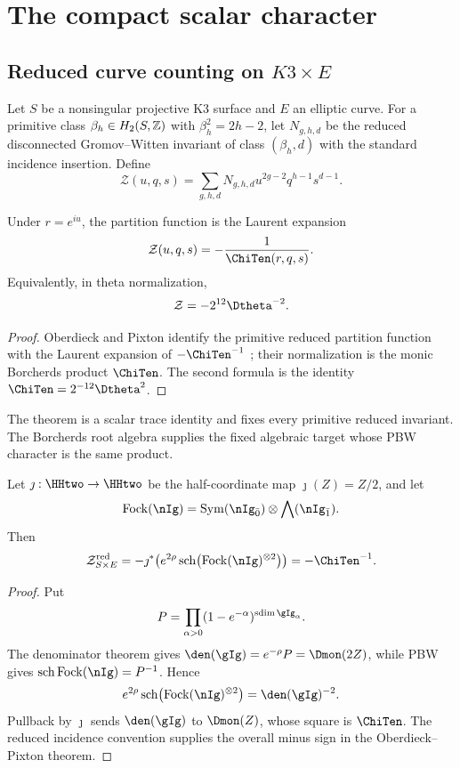 \part{The compact scalar character}

\chapter{Reduced curve counting on \texorpdfstring{$K3\times E$}{K3 x E}}
Let $S$ be a nonsingular projective K3 surface and $E$ an elliptic curve. For a primitive class $\beta_h\in H_2(S,\mathbb Z)$ with $\beta_h^2=2h-2$, let $N_{g,h,d}$ be the reduced disconnected Gromov--Witten invariant of class $(\beta_h,d)$ with the standard incidence insertion. Define
\[
 \mathcal Z(u,q,s)=
 \sum_{g,h,d}N_{g,h,d}u^{2g-2}q^{h-1}s^{d-1}.
\]

\begin{theorem}
Under $r=e^{iu}$, the partition function is the Laurent expansion
\[
 \mathcal Z(u,q,s)=-\frac1{\ChiTen(r,q,s)}.
\]
Equivalently, in theta normalization,
\[
 \mathcal Z=-2^{12}\Dtheta^{-2}.
\]
\end{theorem}
\begin{proof}
Oberdieck and Pixton identify the primitive reduced partition function with the Laurent expansion of $-\ChiTen^{-1}$ \cite{OP}; their normalization is the monic Borcherds product $\ChiTen$. The second formula is the identity $\ChiTen=2^{-12}\Dtheta^2$.
\end{proof}

The theorem is a scalar trace identity and fixes every primitive reduced invariant.  The Borcherds root algebra supplies the fixed algebraic target whose PBW character is the same product.

\begin{corollary}
Let $\jmath:\HHtwo\to\HHtwo$ be the half-coordinate map $\jmath(Z)=Z/2$, and let
\[
 \Fock(\nIg)=
 \Sym(\nIg_{\bar0})\tensor\bigwedge(\nIg_{\bar1}).
\]
Then
\[
 \mathcal Z^{\red}_{S\times E}
 =-\jmath^*\!\left(
 e^{2\rho}\sch\bigl(\Fock(\nIg)^{\tensor2}\bigr)
 \right)
 =-\ChiTen^{-1}.
\]
\end{corollary}
\begin{proof}
Put
\[
 P=\prod_{\alpha>0}(1-e^{-\alpha})^{\sdim\gIg_\alpha}.
\]
The denominator theorem gives $\den(\gIg)=e^{-\rho}P=\Dmon(2Z)$, while PBW gives $\sch\Fock(\nIg)=P^{-1}$.  Hence
\[
 e^{2\rho}\sch\bigl(\Fock(\nIg)^{\tensor2}\bigr)
 =\den(\gIg)^{-2}.
\]
Pullback by $\jmath$ sends $\den(\gIg)$ to $\Dmon(Z)$, whose square is $\ChiTen$.  The reduced incidence convention supplies the overall minus sign in the Oberdieck--Pixton theorem.
\end{proof}

